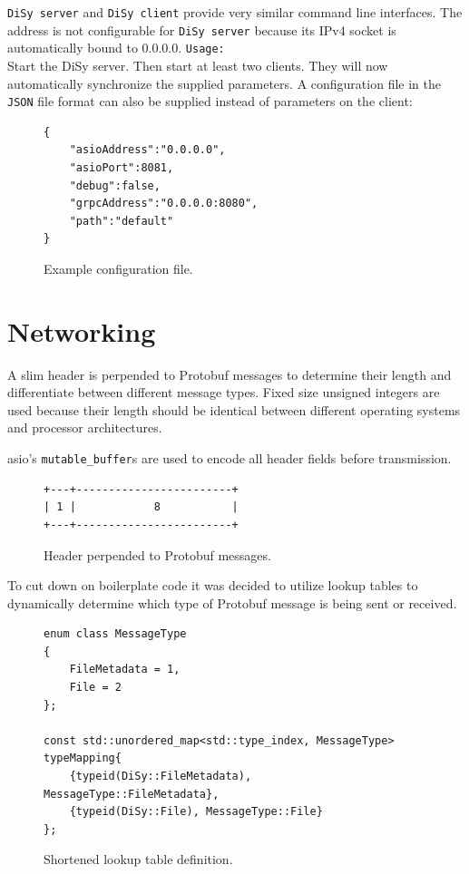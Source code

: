 \documentclass[a4paper]{article}
\begin{document}
\texttt{DiSy server} and \texttt{DiSy client} provide very similar command line interfaces. The address is not configurable for \texttt{DiSy server} because its IPv4 socket is automatically bound to 0.0.0.0.
\bigbreak
\texttt{Usage:}\\
Start the DiSy server. Then start at least two clients. They will now automatically synchronize the supplied parameters.
\bigbreak
A configuration file in the \texttt{JSON} file format can also be supplied instead of parameters on the client:

\begin{figure}[H]
\begin{verbatim}
{
	"asioAddress":"0.0.0.0",
	"asioPort":8081,
	"debug":false,
	"grpcAddress":"0.0.0.0:8080",
	"path":"default"
}
\end{verbatim}
\caption{Example configuration file.}
\end{figure}

\section{Networking}
A slim header is perpended to Protobuf messages to determine their length and differentiate between different message types. Fixed size unsigned integers are used because their length should be identical between different operating systems and processor architectures. 

asio's \texttt{mutable\_buffer}s are used to encode all header fields before transmission.
\begin{figure}[H]
\centering
\begin{BVerbatim}
+---+------------------------+
| 1 |            8           |
+---+------------------------+
\end{BVerbatim}
\caption{Header perpended to Protobuf messages.}
\end{figure}

To cut down on boilerplate code it was decided to utilize lookup tables to dynamically determine which type of Protobuf message is being sent or received. 

\begin{figure}[H]
\begin{verbatim}
enum class MessageType
{
	FileMetadata = 1,
	File = 2
};

const std::unordered_map<std::type_index, MessageType> typeMapping{
	{typeid(DiSy::FileMetadata), MessageType::FileMetadata},
	{typeid(DiSy::File), MessageType::File}
};

\end{verbatim}
\caption{Shortened lookup table definition.}
\end{figure}
\end{document}
